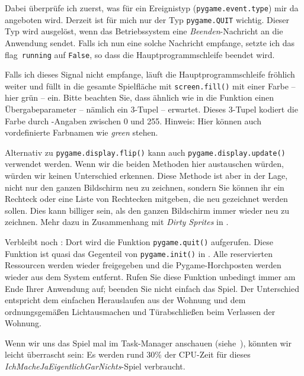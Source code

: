 Dabei überprüfe ich zuerst, was für ein Ereignistyp (\texttt{pygame.event.type}) mir da angeboten wird. Derzeit ist für mich nur der Typ \texttt{pygame.QUIT} wichtig. Dieser Typ wird ausgelöst, wenn das Betriebssystem eine \emph{Beenden}-Nachricht an die Anwendung sendet. Falls ich nun eine solche Nachricht empfange, setzte ich das \Gls{flag}\ \texttt{running} auf \texttt{False}, so dass die Hauptprogrammschleife beendet wird.

Falls ich dieses Signal nicht empfange, läuft die Hauptprogrammschleife fröhlich weiter und füllt in  die gesamte Spielfläche mit \texttt{screen.fill()} mit einer Farbe -- hier grün -- ein. Bitte beachten Sie, dass ähnlich wie in  die Funktion einen Übergabeparameter -- nämlich ein 3-Tupel -- erwartet. Dieses 3-Tupel kodiert die Farbe durch -Angaben zwischen 0 und 255. Hinweis: Hier können auch vordefinierte Farbnamen wie \emph{green} stehen.

Alternativ zu \texttt{pygame.display.flip()} kann auch \texttt{pygame.display.update()} verwendet werden. Wenn wir die beiden Methoden hier austauschen würden, würden wir keinen Unterschied erkennen. Diese Methode ist aber in der Lage, nicht nur den ganzen Bildschirm neu zu zeichnen, sondern Sie können ihr ein Rechteck oder eine Liste von Rechtecken mitgeben, die neu gezeichnet werden sollen. Dies kann billiger sein, als den ganzen Bildschirm immer wieder neu zu zeichnen. Mehr dazu in Zusammenhang mit \emph{Dirty Sprites} in .

Verbleibt noch : Dort wird die Funktion \texttt{pygame.quit()} aufgerufen. Diese Funktion ist quasi das Gegenteil von \texttt{pygame.init()} in . Alle reservierten Ressourcen werden wieder freigegeben und die Pygame-Horchposten werden wieder aus dem System entfernt. Rufen Sie diese Funktion unbedingt immer am Ende Ihrer Anwendung auf; beenden Sie nicht einfach das Spiel. Der Unterschied entspricht dem einfachen Herauslaufen aus der Wohnung und dem ordnungsgemäßen Lichtausmachen und Türabschließen beim Verlassen der Wohnung.  

Wenn wir uns das Spiel mal im Task-Manager anschauen (siehe~), könnten wir leicht überrascht sein: Es werden rund 30\% der CPU-Zeit für dieses \emph{IchMacheJaEigentlichGarNichts}-Spiel verbraucht. 


